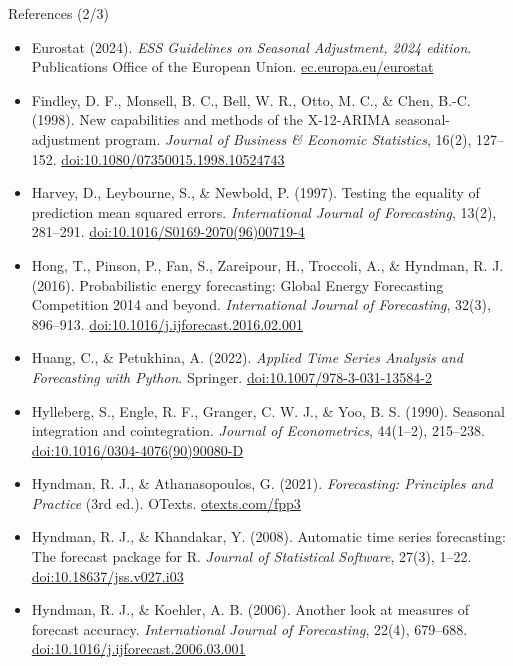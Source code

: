 \begin{frame}{References (2/3)}
\itemsize{\scriptsize}
\begin{itemize}
    \item Eurostat (2024). \textit{ESS Guidelines on Seasonal Adjustment, 2024 edition}. Publications Office of the European Union. \href{https://ec.europa.eu/eurostat/web/products-manuals-and-guidelines/w/ks-gq-24-012}{ec.europa.eu/eurostat}
    \item Findley, D. F., Monsell, B. C., Bell, W. R., Otto, M. C., \& Chen, B.-C. (1998). New capabilities and methods of the X-12-ARIMA seasonal-adjustment program. \textit{Journal of Business \& Economic Statistics}, 16(2), 127--152. \href{https://doi.org/10.1080/07350015.1998.10524743}{doi:10.1080/07350015.1998.10524743}
    \item Harvey, D., Leybourne, S., \& Newbold, P. (1997). Testing the equality of prediction mean squared errors. \textit{International Journal of Forecasting}, 13(2), 281--291. \href{https://doi.org/10.1016/S0169-2070(96)00719-4}{doi:10.1016/S0169-2070(96)00719-4}
    \item Hong, T., Pinson, P., Fan, S., Zareipour, H., Troccoli, A., \& Hyndman, R. J. (2016). Probabilistic energy forecasting: Global Energy Forecasting Competition 2014 and beyond. \textit{International Journal of Forecasting}, 32(3), 896--913. \href{https://doi.org/10.1016/j.ijforecast.2016.02.001}{doi:10.1016/j.ijforecast.2016.02.001}
    \item Huang, C., \& Petukhina, A. (2022). \textit{Applied Time Series Analysis and Forecasting with Python}. Springer. \href{https://doi.org/10.1007/978-3-031-13584-2}{doi:10.1007/978-3-031-13584-2}
    \item Hylleberg, S., Engle, R. F., Granger, C. W. J., \& Yoo, B. S. (1990). Seasonal integration and cointegration. \textit{Journal of Econometrics}, 44(1--2), 215--238. \href{https://doi.org/10.1016/0304-4076(90)90080-D}{doi:10.1016/0304-4076(90)90080-D}
    \item Hyndman, R. J., \& Athanasopoulos, G. (2021). \textit{Forecasting: Principles and Practice} (3rd ed.). OTexts. \href{https://otexts.com/fpp3/}{otexts.com/fpp3}
    \item Hyndman, R. J., \& Khandakar, Y. (2008). Automatic time series forecasting: The forecast package for R. \textit{Journal of Statistical Software}, 27(3), 1--22. \href{https://doi.org/10.18637/jss.v027.i03}{doi:10.18637/jss.v027.i03}
    \item Hyndman, R. J., \& Koehler, A. B. (2006). Another look at measures of forecast accuracy. \textit{International Journal of Forecasting}, 22(4), 679--688. \href{https://doi.org/10.1016/j.ijforecast.2006.03.001}{doi:10.1016/j.ijforecast.2006.03.001}
\end{itemize}
\end{frame}


